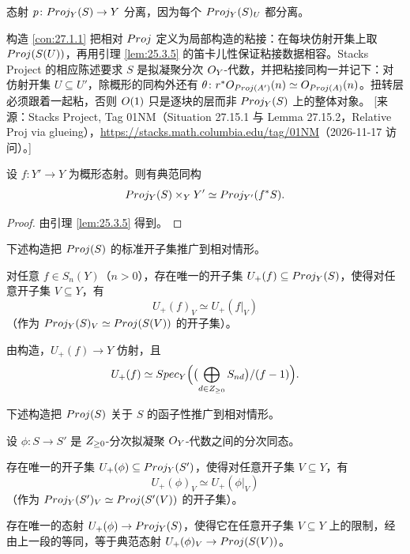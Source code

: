 态射 $p \colon Proj_Y(S) \to Y$ 分离，因为每个 $Proj_Y(S)_U$ 都分离。

\begin{yizhu}
构造 \ref{con:27.1.1} 把相对 $Proj$ 定义为局部构造的粘接：在每块仿射开集上取 $Proj(S(U))$，再用引理 \ref{lem:25.3.5} 的笛卡儿性保证粘接数据相容。Stacks Project 的相应陈述要求 $S$ 是拟凝聚分次 $O_Y$-代数，并把粘接同构一并记下：对仿射开集 $U \subseteq U'$，除概形的同构外还有 $\theta \colon r^*O_{Proj(A')}(n) \simeq O_{Proj(A)}(n)$。扭转层必须跟着一起粘，否则 $O(1)$ 只是逐块的层而非 $Proj_Y(S)$ 上的整体对象。
[来源：Stacks Project, Tag 01NM（Situation 27.15.1 与 Lemma 27.15.2，Relative Proj via glueing），\url{https://stacks.math.columbia.edu/tag/01NM}（2026-11-17 访问）。]
\end{yizhu}

\begin{lemma}\label{lem:27.1.2}
设 $f \colon Y' \to Y$ 为概形态射。则有典范同构
\[
Proj_Y(S) \times_Y Y' \simeq Proj_{Y'}(f^*S).
\]
\end{lemma}

\begin{proof}
由引理 \ref{lem:25.3.5} 得到。
\end{proof}

下述构造把 $Proj(S)$ 的标准开子集推广到相对情形。

\begin{construction}\label{con:27.1.3}
对任意 $f \in S_n(Y)$（$n > 0$），存在唯一的开子集 $U_+(f) \subseteq Proj_Y(S)$，使得对任意开子集 $V \subseteq Y$，有
\[
U_+(f)_V \simeq U_+(f|_V)
\]
（作为 $Proj_Y(S)_V \simeq Proj(S(V))$ 的开子集）。

由构造，$U_+(f) \to Y$ 仿射，且
\[
U_+(f) \simeq Spec_Y\Bigl(\bigl(\bigoplus_{d \in Z_{\ge 0}} S_{nd}\bigr)/(f-1)\Bigr).
\]
\end{construction}

下述构造把 $Proj(S)$ 关于 $S$ 的函子性推广到相对情形。

\begin{construction}\label{con:27.1.4}
设 $\phi \colon S \to S'$ 是 $Z_{\ge 0}$-分次拟凝聚 $O_Y$-代数之间的分次同态。

存在唯一的开子集 $U_+(\phi) \subseteq Proj_Y(S')$，使得对任意开子集 $V \subseteq Y$，有
\[
U_+(\phi)_V \simeq U_+(\phi|_V)
\]
（作为 $Proj_Y(S')_V \simeq Proj(S'(V))$ 的开子集）。

存在唯一的态射 $U_+(\phi) \to Proj_Y(S)$，使得它在任意开子集 $V \subseteq Y$ 上的限制，经由上一段的等同，等于典范态射 $U_+(\phi)_V \to Proj(S(V))$。
\end{construction}

